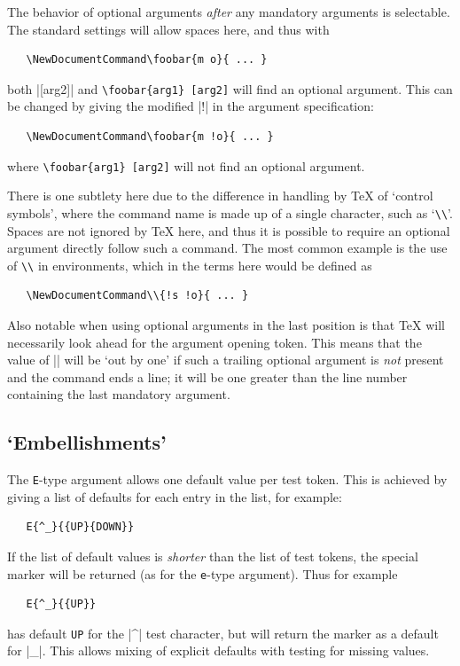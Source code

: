 \documentclass{ltxguide}
\begin{document}
The behavior of optional arguments \emph{after} any mandatory arguments is
selectable. The standard settings will allow spaces here, and thus with
\begin{verbatim}
   \NewDocumentCommand\foobar{m o}{ ... }
\end{verbatim}
both |[arg2]| and \verb*|\foobar{arg1} [arg2]| will find an
optional argument. This can be changed by giving the modified |!| in the
argument specification:
\begin{verbatim}
   \NewDocumentCommand\foobar{m !o}{ ... }
\end{verbatim}
where \verb*|\foobar{arg1} [arg2]| will not find an optional argument.

There is one subtlety here due to the difference in handling by \TeX{} of
`control symbols', where the command name is made up of a single
character, such as `\texttt{\textbackslash\textbackslash}'.
Spaces are not ignored by \TeX{} here,
and thus it is possible to require an optional argument directly follow such a
command. The most common example is the use of \texttt{\textbackslash\textbackslash}
in  environments, which in the terms here would be defined as
\begin{verbatim}
   \NewDocumentCommand\\{!s !o}{ ... }
\end{verbatim}

Also notable when using optional arguments in the last position is that \TeX{}
will necessarily look ahead for the argument opening token. This means that
the value of || will be `out by one' if such a trailing optional
argument is \emph{not} present and the command ends a line; it will be one
greater than the line number containing the last mandatory argument.

\subsection{`Embellishments'}
\label{sec:cmd:embellishment}

The \texttt{E}-type argument allows one default value per test token. This is
achieved by giving a list of defaults for each entry in the list, for example:
\begin{verbatim}
   E{^_}{{UP}{DOWN}}
\end{verbatim}
If the list of default values is \emph{shorter} than the list of test tokens,
the special  marker will be returned (as for the \texttt{e}-type
argument). Thus for example
\begin{verbatim}
   E{^_}{{UP}}
\end{verbatim}
has default \texttt{UP} for the |^| test character, but will return the
 marker as a default for |_|. This allows mixing of explicit
defaults with testing for missing values.
\end{document}
